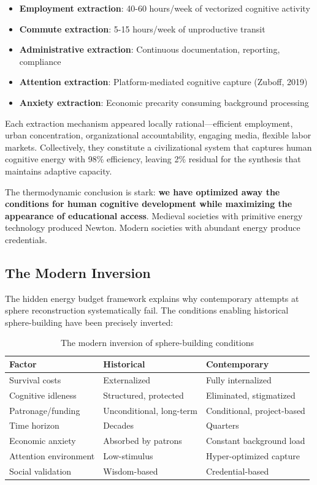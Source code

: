 \begin{itemize}
    \item \textbf{Employment extraction}: 40-60 hours/week of vectorized cognitive activity
    \item \textbf{Commute extraction}: 5-15 hours/week of unproductive transit
    \item \textbf{Administrative extraction}: Continuous documentation, reporting, compliance
    \item \textbf{Attention extraction}: Platform-mediated cognitive capture (Zuboff, 2019)
    \item \textbf{Anxiety extraction}: Economic precarity consuming background processing
\end{itemize}

Each extraction mechanism appeared locally rational---efficient employment, urban concentration, organizational accountability, engaging media, flexible labor markets. Collectively, they constitute a civilizational system that captures human cognitive energy with 98\% efficiency, leaving 2\% residual for the synthesis that maintains adaptive capacity.

The thermodynamic conclusion is stark: \textbf{we have optimized away the conditions for human cognitive development while maximizing the appearance of educational access}. Medieval societies with primitive energy technology produced Newton. Modern societies with abundant energy produce credentials.

\subsection{The Modern Inversion}

The hidden energy budget framework explains why contemporary attempts at sphere reconstruction systematically fail. The conditions enabling historical sphere-building have been precisely inverted:

\begin{table}[htbp]
\centering
\caption{The modern inversion of sphere-building conditions}
\begin{tabular}{lll}
\toprule
\textbf{Factor} & \textbf{Historical} & \textbf{Contemporary} \\
\midrule
Survival costs & Externalized & Fully internalized \\
Cognitive idleness & Structured, protected & Eliminated, stigmatized \\
Patronage/funding & Unconditional, long-term & Conditional, project-based \\
Time horizon & Decades & Quarters \\
Economic anxiety & Absorbed by patrons & Constant background load \\
Attention environment & Low-stimulus & Hyper-optimized capture \\
Social validation & Wisdom-based & Credential-based \\
\bottomrule
\end{tabular}
\label{tab:modern-inversion}
\end{table}

